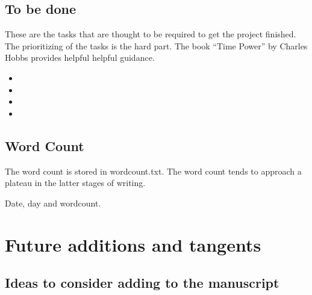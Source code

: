 \documentclass[10pt,letterpaper]{article}
\newcommand{\bi}{\begin{itemize}}
\newcommand{\ei}{\end{itemize}}
\begin{document}
\subsection{To be done}
\label{sub:to-do}

These are the tasks that are thought to be required to get the project finished.
The prioritizing of the tasks is the hard part.
The book ``Time Power'' by Charles Hobbs provides helpful helpful guidance.

\bi
\item 
\item 
\item 
\item 
\ei



\subsection{Word Count}
\label{sub:wordcount}

The word count is stored in wordcount.txt.
The word count tends to approach a plateau in the latter stages of writing.

\begin{figure}[htp!]
  \centering
\end{figure}

\begin{table}[]
  \centering
  \caption{Date, day and wordcount.}
  \label{tab:my_label}
\end{table}


\section{Future additions and tangents}
\label{sec:future}


\subsection{Ideas to consider adding to the manuscript}
\label{subsec:new-ideas}
\end{document}
